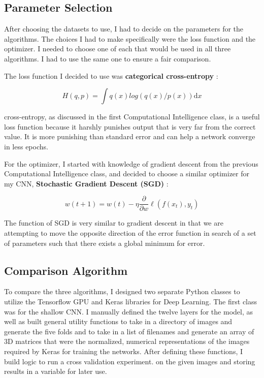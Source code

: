 \documentclass[12pt]{article}
\begin{document}
	\subsection{Parameter Selection}
After choosing the datasets to use, I had to decide on the parameters for the algorithms. The choices I had to make specifically were the loss function and the optimizer. I needed to choose one of each that would be used in all three algorithms. I had to use the same one to ensure a fair comparison. 

The loss function I decided to use was \textbf{categorical cross-entropy} \cite{cross_entropy}: 
		
\[
		H(q,p) =  \int q(x) log(q(x) / p(x)) \mathrm{d}x
\]

cross-entropy, as discussed in the first Computational Intelligence class, is a useful loss function because it harshly punishes output that is very far from the correct value. It is more punishing than standard error and can help a network converge in less epochs. 

For the optimizer, I started with knowledge of gradient descent from the previous Computational Intelligence class, and decided to choose a similar optimizer for my CNN, \textbf{Stochastic Gradient Descent (SGD)} \cite{sgd}:

\[
	w(t+1) = w(t) - \eta \frac{\partial}{\partial w} \ell(f(x_t), y_t)
\]

The function of SGD is very similar to gradient descent in that we are attempting to move the opposite direction of the error function in search of a set of parameters such that there exists a global minimum for error.

	\subsection{Comparison Algorithm}
	
To compare the three algorithms, I designed two separate Python classes to utilize the Tensorflow GPU and Keras libraries for Deep Learning. The first class was for the shallow CNN. I manually defined the twelve layers for the model, as well as built general utility functions to take in a directory of images and generate the five folds and to take in a list of filenames and generate an array of 3D matrices that were the normalized, numerical representations of the images required by Keras for training the networks. After defining these functions, I build logic to run a cross validation experiment. on the given images and storing results in a variable for later use.
\end{document}
